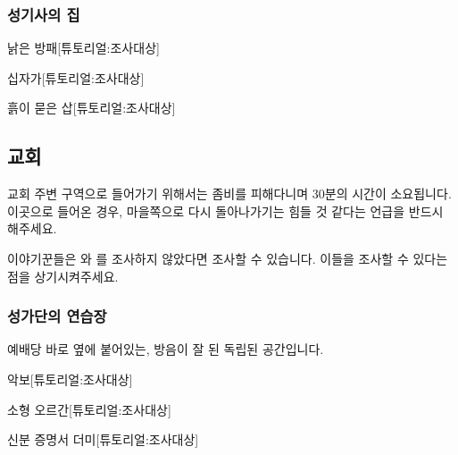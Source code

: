 \documentclass{report}
\begin{document}
				\hypertarget{search:paladin}{}
				\subsubsection*{성기사의 집}
					
					\begin{spoiler}{낡은 방패}{[튜토리얼:조사대상]}
					\end{spoiler}
					
					\begin{spoiler}{십자가}{[튜토리얼:조사대상]}
					\end{spoiler}
					
					\begin{spoiler}{흙이 묻은 삽}{[튜토리얼:조사대상]}
					\end{spoiler}
				
			\subsection{교회}
				교회 주변 구역으로 들어가기 위해서는 좀비를 피해다니며 30분의 시간이 소요됩니다. 이곳으로 들어온 경우, 마을쪽으로 다시 돌아나가기는 힘들 것 같다는 언급을 반드시 해주세요.
				
				이야기꾼들은 와 를 조사하지 않았다면 조사할 수 있습니다. 이들을 조사할 수 있다는 점을 상기시켜주세요.
				
				\hypertarget{search:choir-practice}{}
				\subsubsection*{성가단의 연습장}
					예배당 바로 옆에 붙어있는, 방음이 잘 된 독립된 공간입니다.
					
					\begin{spoiler}{악보}{[튜토리얼:조사대상]}
					\end{spoiler}
					
					\begin{spoiler}{소형 오르간}{[튜토리얼:조사대상]}
					\end{spoiler}
					
					\begin{spoiler}{신분 증명서 더미}{[튜토리얼:조사대상]}
					\end{spoiler}
				
\end{document}
